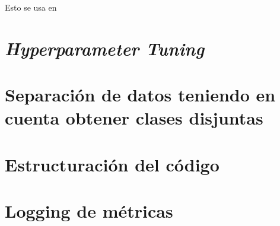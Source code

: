 Esto se usa en \cite{informatica:facenet}

\section{\textit{Hyperparameter Tuning}} \label{isec:hp_tuning}

\section{Separación de datos teniendo en cuenta obtener clases disjuntas}

\section{Estructuración del código}

\section{Logging de métricas} \label{isec:loggin_metricas}


